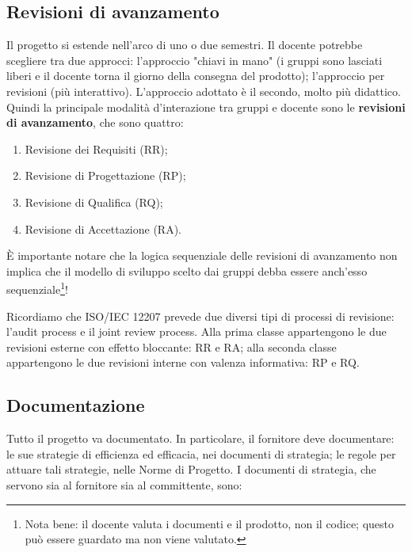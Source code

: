 \documentclass[a4paper]{article}
\begin{document}
		
	\subsection{Revisioni di avanzamento}

		
Il progetto si estende nell'arco di uno o due semestri. Il docente potrebbe scegliere tra due approcci: l'approccio "chiavi in mano" (i gruppi sono lasciati liberi e il docente torna il giorno della consegna del prodotto); l'approccio per revisioni (più interattivo). L'approccio adottato è il secondo, molto più didattico. Quindi la principale modalità d'interazione tra gruppi e docente sono le \textbf{revisioni di avanzamento}, che sono quattro:
		
	\begin{enumerate}
		
			
	\item Revisione dei Requisiti (RR);
			
	\item Revisione di Progettazione (RP);
			
	\item Revisione di Qualifica (RQ);
			
	\item Revisione di Accettazione (RA).
		
	\end{enumerate}

		
È importante notare che la logica sequenziale delle revisioni di avanzamento non implica che il modello di sviluppo scelto dai gruppi debba essere anch'esso sequenziale\footnote{Nota bene: il docente valuta i documenti e il prodotto, non il codice; questo può essere guardato ma non viene valutato.}!
		
Ricordiamo che ISO/IEC 12207 prevede due diversi tipi di processi di revisione: l'audit process e il joint review process. Alla prima classe appartengono le due revisioni esterne con effetto bloccante: RR e RA; alla seconda classe appartengono le due revisioni interne con valenza informativa: RP e RQ.

		
	\subsection{Documentazione}

		
Tutto il progetto va documentato. In particolare, il fornitore deve documentare: le sue strategie di efficienza ed efficacia, nei documenti di strategia; le regole per attuare tali strategie, nelle Norme di Progetto. I documenti di strategia, che servono sia al fornitore sia al committente, sono:
		
\end{document}
